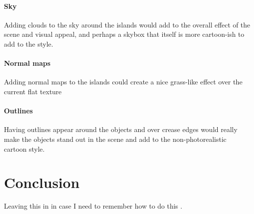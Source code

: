 \documentclass[10pt, a4paper]{article}
\begin{document}
	\paragraph{Sky}
	Adding clouds to the sky around the islands would
	add to the overall effect of the scene and visual appeal,
	and perhaps a skybox that itself is more cartoon-ish to
	add to the style.
	\paragraph{Normal maps}
	Adding normal maps to the islands could create a nice grass-like effect over the current flat texture
	\paragraph{Outlines}
	Having outlines appear around the objects and over crease edges would really make the objects stand out in the scene and add to the non-photorealistic cartoon style.
	
\section{Conclusion}	



 Leaving this in in case I need to remember how to do this \cite{Outlines}.
		
\end{document}
